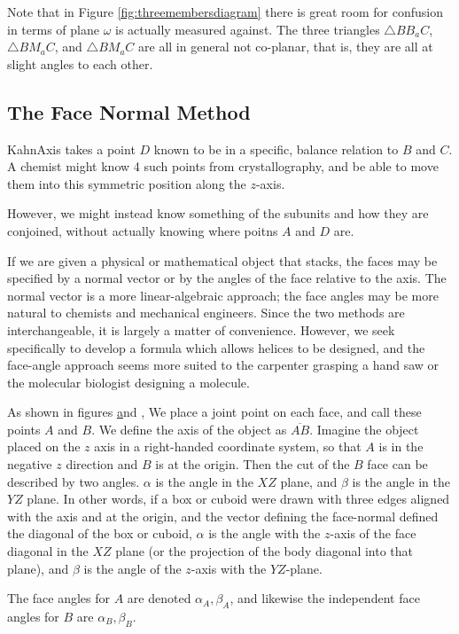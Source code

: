 \documentclass[11pt]{article}
\begin{document}
{Note that in Figure \ref{fig:threemembersdiagram} there is great
room for confusion in terms of plane $\omega$ is actually
measured against. The three triangles $\triangle BB_aC$, $\triangle BM_aC$, and $\triangle BM_aC$
are all in general not co-planar, that is, they are all at
slight angles to each other.  

\subsection{The Face Normal Method}

KahnAxis takes a point $D$ known to be in a specific, balance relation
to $B$ and $C$. A chemist might know 4 such points from crystallography,
and be able to move them into this symmetric position along the $z$-axis.

However, we might instead know something of the subunits and
how they are conjoined, without actually knowing where poitns $A$
and $D$ are.

If we are given a physical or mathematical object that stacks,
the faces may be specified by a normal vector or by the
angles of the face relative to the axis. The normal vector
is a more linear-algebraic approach; the face angles may be more
natural to chemists and mechanical engineers. Since
the two methods are interchangeable, it is largely a matter of
convenience. However, we seek specifically to develop a formula
which allows helices to be designed, and the face-angle approach
seems more suited to the carpenter grasping a hand saw or the
molecular biologist designing a molecule.

As shown in figures \href{fig:intrinsicdiagram} and \href{fig:jointdiagram},
We place a joint point on each face, and call these points $A$ and $B$.
We define the axis of the object as $\overline{AB}$. Imagine the
object placed on the $z$ axis in a right-handed coordinate system, so that
$A$ is in the negative $z$ direction and $B$ is at the origin. Then
the cut of the $B$ face can be described by two angles. $\alpha$ is the
angle in the $XZ$ plane, and $\beta$ is the angle in the $YZ$ plane.
In other words, if a box or cuboid were drawn with three edges aligned
with the axis and at the origin, and the vector defining the face-normal
defined the diagonal of the box or cuboid, $\alpha$ is the angle with the $z$-axis
of the
face diagonal in the $XZ$ plane (or the projection of the body diagonal
into that plane), and $\beta$ is the angle of the $z$-axis with the $YZ$-plane.

The face angles for $A$ are denoted $\alpha_A, \beta_A$, and likewise
the independent face angles for $B$ are $\alpha_B, \beta_B$.


}
\end{document}
